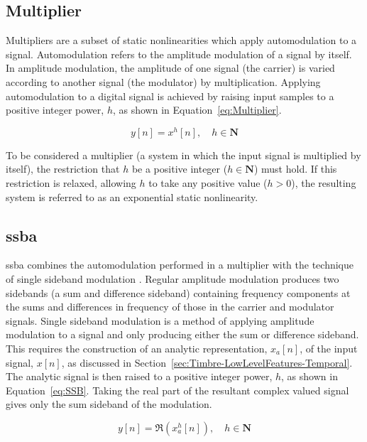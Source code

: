 	\subsection{Multiplier}
	\label{sec:Excitation-Methods-Multiplier}
		Multipliers are a subset of static nonlinearities which apply automodulation to a signal. Automodulation
		refers to the amplitude modulation of a signal by itself. In amplitude modulation, the amplitude of one
		signal (the carrier) is varied according to another signal (the modulator) by multiplication.  Applying
		automodulation to a digital signal is achieved by raising input samples to a positive integer power, $h$,
		as shown in Equation~\ref{eq:Multiplier}.

		\begin{equation}
			y[n] = x^{h}[n], \quad h \in \textbf{N}
			\label{eq:Multiplier}
		\end{equation}

		To be considered a multiplier (a system in which the input signal is multiplied by itself), the restriction
		that $h$ be a positive integer ($h \in \textbf{N}$) must hold. If this restriction is relaxed, allowing $h$
		to take any positive value ($h > 0$), the resulting system is referred to as an exponential static
		nonlinearity.

	\subsection{\acrlong{ssba}}
	\label{sec:Excitation-Methods-SSBA}
		\acrfull{ssba} combines the automodulation performed in a multiplier with the technique of single sideband
		modulation \citep{corinthios2009signals}. Regular amplitude modulation produces two sidebands (a sum and
		difference sideband) containing frequency components at the sums and differences in frequency of those in
		the carrier and modulator signals. Single sideband modulation is a method of applying amplitude modulation
		to a signal and only producing either the sum or difference sideband. This requires the construction of an
		analytic representation, $x_{a}[n]$, of the input signal, $x[n]$, as discussed in
		Section~\ref{sec:Timbre-LowLevelFeatures-Temporal}. The analytic signal is then raised to a positive
		integer power, $h$, as shown in Equation~\ref{eq:SSB}. Taking the real part of the resultant complex valued
		signal gives only the sum sideband of the modulation.

		\begin{equation}
			y[n] = \Re \left( x_{a}^{h}[n] \right), \quad h \in \textbf{N}
			\label{eq:SSB}
		\end{equation}

